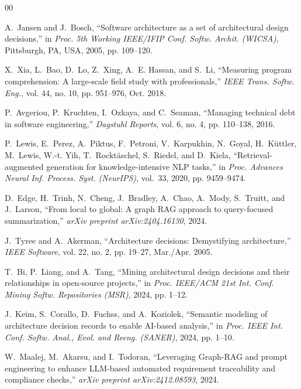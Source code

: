 \documentclass[conference]{IEEEtran}
\begin{document}
\begin{thebibliography}{00}

A.~Jansen and J.~Bosch, ``Software architecture as a set of architectural design decisions,'' in \emph{Proc. 5th Working IEEE/IFIP Conf. Softw. Archit. (WICSA)}, Pittsburgh, PA, USA, 2005, pp. 109--120.

X.~Xia, L.~Bao, D.~Lo, Z.~Xing, A.~E. Hassan, and S.~Li, ``Measuring program comprehension: A large-scale field study with professionals,'' \emph{IEEE Trans. Softw. Eng.}, vol. 44, no. 10, pp. 951--976, Oct. 2018.

P.~Avgeriou, P.~Kruchten, I.~Ozkaya, and C.~Seaman, ``Managing technical debt in software engineering,'' \emph{Dagstuhl Reports}, vol. 6, no. 4, pp. 110--138, 2016.

P.~Lewis, E.~Perez, A.~Piktus, F.~Petroni, V.~Karpukhin, N.~Goyal, H.~K{\"u}ttler, M.~Lewis, W.-t. Yih, T.~Rockt{\"a}schel, S.~Riedel, and D.~Kiela, ``Retrieval-augmented generation for knowledge-intensive NLP tasks,'' in \emph{Proc. Advances Neural Inf. Process. Syst. (NeurIPS)}, vol.~33, 2020, pp. 9459--9474.

D.~Edge, H.~Trinh, N.~Cheng, J.~Bradley, A.~Chao, A.~Mody, S.~Truitt, and J.~Larson, ``From local to global: A graph RAG approach to query-focused summarization,'' \emph{arXiv preprint arXiv:2404.16130}, 2024.

J.~Tyree and A.~Akerman, ``Architecture decisions: Demystifying architecture,'' \emph{IEEE Software}, vol. 22, no. 2, pp. 19--27, Mar./Apr. 2005.

T.~Bi, P.~Liang, and A.~Tang, ``Mining architectural design decisions and their relationships in open-source projects,'' in \emph{Proc. IEEE/ACM 21st Int. Conf. Mining Softw. Repositories (MSR)}, 2024, pp. 1--12.

J.~Keim, S.~Corallo, D.~Fuchss, and A.~Koziolek, ``Semantic modeling of architecture decision records to enable AI-based analysis,'' in \emph{Proc. IEEE Int. Conf. Softw. Anal., Evol. and Reeng. (SANER)}, 2024, pp. 1--10.

W.~Maalej, M.~Akarsu, and I.~Todoran, ``Leveraging Graph-RAG and prompt engineering to enhance LLM-based automated requirement traceability and compliance checks,'' \emph{arXiv preprint arXiv:2412.08593}, 2024.


\end{thebibliography}
\end{document}
